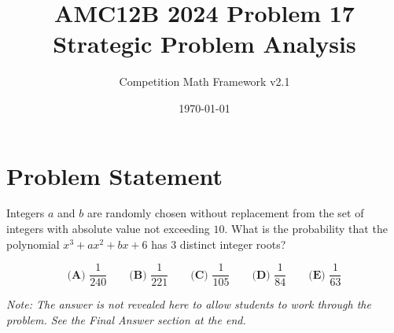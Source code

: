\documentclass[12pt]{article}
\begin{document}
\title{AMC12B 2024 Problem 17\\Strategic Problem Analysis}
\author{Competition Math Framework v2.1}
\date{\today}
\maketitle

\section*{Problem Statement}

Integers $a$ and $b$ are randomly chosen without replacement from the set of integers with absolute value not exceeding $10$. What is the probability that the polynomial $x^3 + ax^2 + bx + 6$ has $3$ distinct integer roots?

$$\textbf{(A) } \frac{1}{240} \qquad \textbf{(B) } \frac{1}{221} \qquad \textbf{(C) } \frac{1}{105} \qquad \textbf{(D) } \frac{1}{84} \qquad \textbf{(E) } \frac{1}{63}$$

\vspace{0.3cm}
\noindent\textit{Note: The answer is not revealed here to allow students to work through the problem. See the Final Answer section at the end.}
\end{document}
